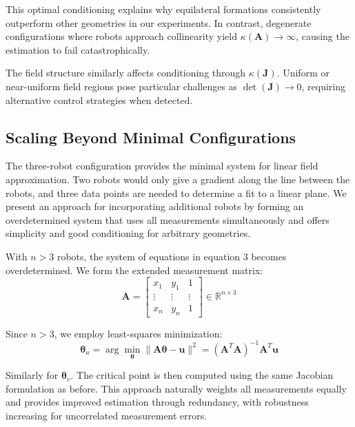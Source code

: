 \documentclass[lettersize,journal]{IEEEtran}
\begin{document}
This optimal conditioning explains why equilateral formations consistently outperform other geometries in our experiments. In contrast, degenerate configurations where robots approach collinearity yield $\kappa(\mathbf{A}) \to \infty$, causing the estimation to fail catastrophically.

The field structure similarly affects conditioning through $\kappa(\mathbf{J})$. Uniform or near-uniform field regions pose particular challenges as $\det(\mathbf{J}) \to 0$, requiring alternative control strategies when detected.



\subsection{Scaling Beyond Minimal Configurations}

The three-robot configuration provides the minimal system for linear field approximation. Two robots would only give a gradient along the line between the robots, and three data points are needed to determine a fit to a linear plane. We present an approach for incorporating additional robots by forming an overdetermined system that uses all measurements simultaneously and offers simplicity and good conditioning for arbitrary geometries.

With $n > 3$ robots, the system of equations in equation 3 becomes overdetermined. We form the extended measurement matrix:
\begin{equation}
\mathbf{A} = \begin{bmatrix} x_1 & y_1 & 1 \\ \vdots & \vdots & \vdots \\ x_n & y_n & 1 \end{bmatrix} \in \mathbb{R}^{n \times 3}
\end{equation}

Since $n > 3$, we employ least-squares minimization:
\begin{equation}
\boldsymbol{\theta}_u = \arg\min_{\boldsymbol{\theta}} \|\mathbf{A}\boldsymbol{\theta} - \mathbf{u}\|^2 = (\mathbf{A}^T\mathbf{A})^{-1}\mathbf{A}^T\mathbf{u}
\end{equation}

Similarly for $\boldsymbol{\theta}_v$. The critical point is then computed using the same Jacobian formulation as before. This approach naturally weights all measurements equally and provides improved estimation through redundancy, with robustness increasing for uncorrelated measurement errors.
\end{document}
